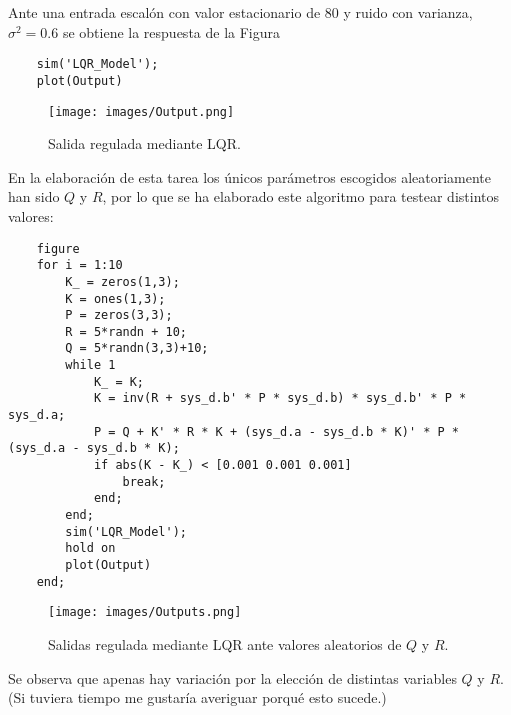 \documentclass[a4paper, fontsize=11pt]{scrartcl} %
\numberwithin{equation}{section} %
\numberwithin{figure}{section} %
\numberwithin{table}{section} %
\begin{document}
	Ante una entrada escalón con valor estacionario de $80$ y ruido con varianza, $\sigma^2 = 0.6$ se obtiene la respuesta de la Figura 
	
	\begin{lstlisting}
	sim('LQR_Model');
	plot(Output)
	\end{lstlisting}
	
	\begin{figure}[h!]
		\centering
		\texttt{[image: images/Output.png]}
		\caption{Salida regulada mediante LQR.}
		\label{Output}
	\end{figure}
	\FloatBarrier
	
	En la elaboración de esta tarea los únicos parámetros escogidos aleatoriamente han sido $Q$ y $R$, por lo que se ha elaborado este algoritmo para testear distintos valores:
	
	\begin{lstlisting}
	figure
	for i = 1:10
		K_ = zeros(1,3);
		K = ones(1,3);
		P = zeros(3,3);
		R = 5*randn + 10;
		Q = 5*randn(3,3)+10;
		while 1
			K_ = K;
			K = inv(R + sys_d.b' * P * sys_d.b) * sys_d.b' * P * sys_d.a;
			P = Q + K' * R * K + (sys_d.a - sys_d.b * K)' * P * (sys_d.a - sys_d.b * K);
			if abs(K - K_) < [0.001 0.001 0.001]
				break;
			end;
		end;
		sim('LQR_Model');
		hold on
		plot(Output)
	end;
	\end{lstlisting}
	
	\begin{figure}[h!]
		\centering
		\texttt{[image: images/Outputs.png]}
		\caption{Salidas regulada mediante LQR ante valores aleatorios de $Q$ y $R$.}
		\label{Outpust}
	\end{figure}
	\FloatBarrier
	Se observa que apenas hay variación por la elección de distintas variables $Q$ y $R$. (Si tuviera tiempo me gustaría averiguar porqué esto sucede.)
	
\end{document}
